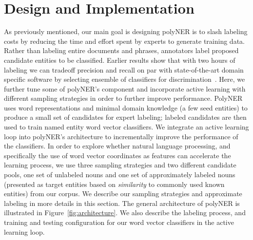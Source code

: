 \section{Design and Implementation}
\label{sect:apner_architecture}
As previously mentioned, our main goal is designing polyNER is to slash labeling costs by reducing the time and effort spent by experts to generate training data. 
Rather than labeling entire documents and phrases, annotators label proposed candidate entities to be classified.
Earlier results show that with two hours of labeling we can 
tradeoff precision and recall on par with state-of-the-art domain specific software by selecting ensemble of classifiers for discrimination~\cite{tchoua2019polyner}.%
Here, we further tune some of polyNER's component and incorporate active learning with different sampling strategies in order to further improve performance.
PolyNER uses word representations and minimal domain knowledge (a few
seed entities) to produce a small set of candidates for expert labeling;
labeled candidates are then used to train named entity word vector classifiers.
We integrate an active learning loop into polyNER's architecture to incrementally improve the performance of the classifiers.
In order to explore whether natural language processing, and specifically the use of word vector coordinates as features can accelerate the learning process,
we use three sampling strategies and two different candidate pools, one set of unlabeled nouns and one set of approximately labeled nouns (presented as target entities based on \textit{similarity} to commonly used known entities) from our corpus.
We describe our sampling strategies and approximate labeling in more details in this section.
The general architecture of polyNER is illustrated in Figure~\ref{fig:architecture}.
We also describe the labeling process, and training and testing configuration for our word vector classifiers in the active learning loop. 

